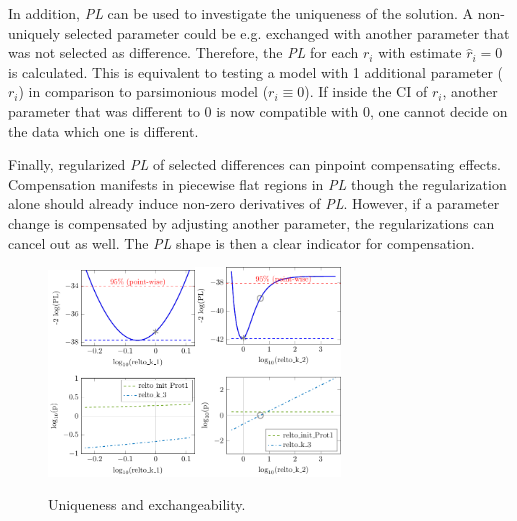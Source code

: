\documentclass{bioinfo}
\begin{document}
In addition, \emph{PL} can be used to investigate the uniqueness of the solution.
A non-uniquely selected parameter could be e.g. exchanged with another parameter that was not selected as difference.
Therefore, the \emph{PL} for each $r_i$ with estimate $\hat r_i=0$ is calculated.
This is equivalent to testing a model with 1 additional parameter ($r_i$) in comparison to parsimonious model ($r_i \equiv 0$).
If inside the CI of $r_i$, another parameter that was different to $0$ is now compatible with $0$, one cannot decide on the data which one is different.

Finally, regularized \emph{PL} of selected differences can pinpoint compensating effects.
Compensation manifests in piecewise flat regions in \emph{PL} though the regularization alone should already induce non-zero derivatives of \emph{PL}.
However, if a parameter change is compensated by adjusting another parameter, the regularizations can cancel out as well.
The \emph{PL} shape is then a clear indicator for compensation.

\begin{figure}[!tpb]%
\centerline{\includegraphics[width=110pt]{Figures/relto_k_1.pdf}\includegraphics[width=110pt]{Figures/relto_k_2.pdf}}
\caption{Uniqueness and exchangeability.}\label{fig:01}
\end{figure}
\end{document}

